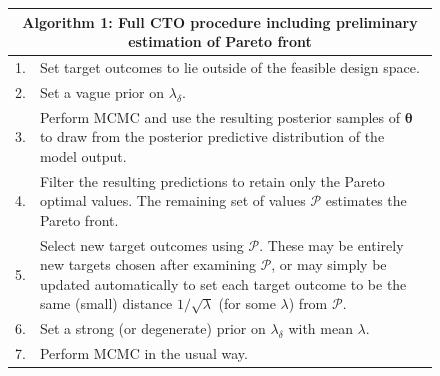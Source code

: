 \documentclass[12pt]{article}
\begin{document}
\begin{figure}
\centering
\begin{tabular}{|l|p{5.5in}|}
\hline
\multicolumn{2}{|c|}{Algorithm 1: Full CTO procedure including preliminary estimation of Pareto front}\\
\hline
1.& Set target outcomes to lie outside of the feasible design space.\\
2.&  Set a vague prior on $\lambda_\delta$.\\
3.&  Perform MCMC and use the resulting posterior samples of $\boldsymbol\theta$ to draw from the posterior predictive distribution of the model output.\\
4.&  Filter the resulting predictions to retain only the Pareto optimal values. The remaining set of values $\mathcal P$ estimates the Pareto front.\\
5.& Select new target outcomes using $\mathcal P$. These may be entirely new targets chosen after examining $\mathcal P$, or may simply be updated automatically to set each target outcome to be the same (small) distance $1/\sqrt{\lambda}$ (for some $\lambda$) from $\mathcal P$.\\
6.& Set a strong (or degenerate) prior on $\lambda_\delta$ with mean $\lambda$.\\
7.& Perform MCMC in the usual way.\\
\hline
\end{tabular}
\label{alg:CDO_alg}
\end{figure}
\end{document}
